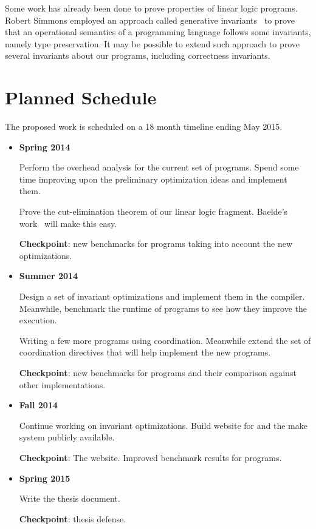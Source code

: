 Some work has already been done to prove properties of linear logic programs.
Robert Simmons employed an approach called generative invariants~\cite{simmons:Thesis} to prove that an operational semantics of a programming
language follows some invariants, namely type preservation. It may be possible to extend such approach to
prove several invariants about our programs, including correctness invariants.

\section{Planned Schedule}

The proposed work is scheduled on a 18 month timeline ending May 2015.

\begin{itemize}
   \item \textbf{Spring 2014}
      
   Perform the overhead analysis for the current set of \lang programs.
   Spend some time improving upon the preliminary optimization ideas and implement them.

   Prove the cut-elimination theorem of our linear logic fragment. Baelde's work~\cite{Baelde:2012:LGF:2071368.2071370} will make this easy.
   
   \textbf{Checkpoint}: new benchmarks for \lang programs taking into account the new optimizations.

   \item \textbf{Summer 2014}
   
   Design a set of invariant optimizations and implement them in the compiler. Meanwhile, benchmark the runtime of programs to see how they improve the execution.

   Writing a few more programs using coordination.
   Meanwhile extend the set of coordination directives that will help implement the new programs.

   \textbf{Checkpoint}: new benchmarks for \lang programs and their comparison against other implementations.
   
   \item \textbf{Fall 2014}
   
   Continue working on invariant optimizations.
   Build website for \lang and the make \lang system publicly available.
   
   \textbf{Checkpoint}: The \lang website. Improved benchmark results for \lang programs.
   
   \item \textbf{Spring 2015}
   
   Write the thesis document.
   
   \textbf{Checkpoint}: thesis defense.

\end{itemize}